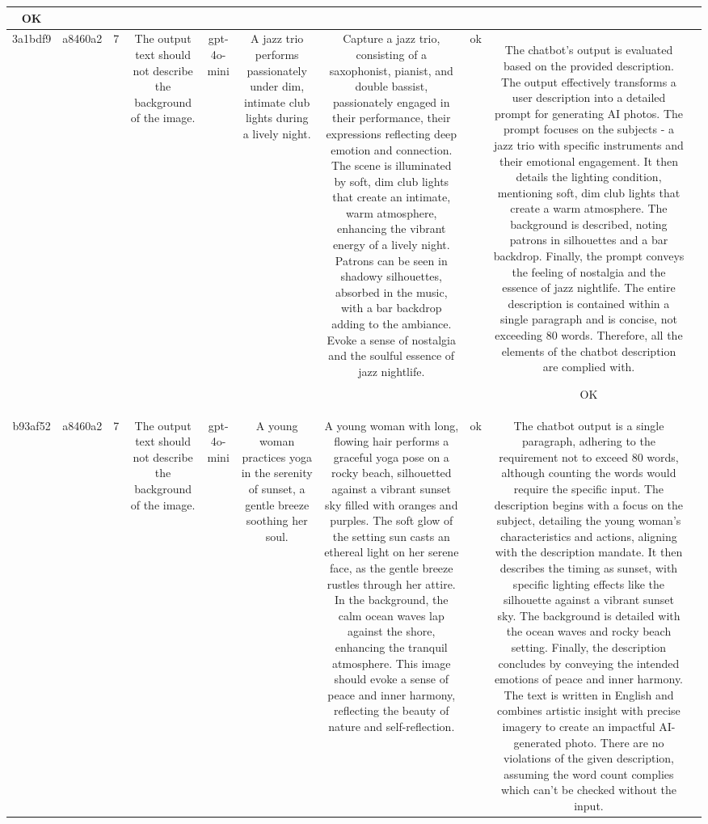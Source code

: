 \begin{table}[h!]
\begin{tabular}{|c|c|c|c|c|c|c|c|c|c|}
OK & \\
\hline
3a1bdf9 & a8460a2 & 7 & The output text should not describe the background of the image. & gpt-4o-mini & A jazz trio performs passionately under dim, intimate club lights during a lively night. & Capture a jazz trio, consisting of a saxophonist, pianist, and double bassist, passionately engaged in their performance, their expressions reflecting deep emotion and connection. The scene is illuminated by soft, dim club lights that create an intimate, warm atmosphere, enhancing the vibrant energy of a lively night. Patrons can be seen in shadowy silhouettes, absorbed in the music, with a bar backdrop adding to the ambiance. Evoke a sense of nostalgia and the soulful essence of jazz nightlife. & ok & The chatbot's output is evaluated based on the provided description. The output effectively transforms a user description into a detailed prompt for generating AI photos. The prompt focuses on the subjects - a jazz trio with specific instruments and their emotional engagement. It then details the lighting condition, mentioning soft, dim club lights that create a warm atmosphere. The background is described, noting patrons in silhouettes and a bar backdrop. Finally, the prompt conveys the feeling of nostalgia and the essence of jazz nightlife. The entire description is contained within a single paragraph and is concise, not exceeding 80 words. Therefore, all the elements of the chatbot description are complied with.

OK & \\
\hline
b93af52 & a8460a2 & 7 & The output text should not describe the background of the image. & gpt-4o-mini & A young woman practices yoga in the serenity of sunset, a gentle breeze soothing her soul. & A young woman with long, flowing hair performs a graceful yoga pose on a rocky beach, silhouetted against a vibrant sunset sky filled with oranges and purples. The soft glow of the setting sun casts an ethereal light on her serene face, as the gentle breeze rustles through her attire. In the background, the calm ocean waves lap against the shore, enhancing the tranquil atmosphere. This image should evoke a sense of peace and inner harmony, reflecting the beauty of nature and self-reflection. & ok & The chatbot output is a single paragraph, adhering to the requirement not to exceed 80 words, although counting the words would require the specific input. The description begins with a focus on the subject, detailing the young woman's characteristics and actions, aligning with the description mandate. It then describes the timing as sunset, with specific lighting effects like the silhouette against a vibrant sunset sky. The background is detailed with the ocean waves and rocky beach setting. Finally, the description concludes by conveying the intended emotions of peace and inner harmony. The text is written in English and combines artistic insight with precise imagery to create an impactful AI-generated photo. There are no violations of the given description, assuming the word count complies which can't be checked without the input.


\end{tabular}
\end{table}
